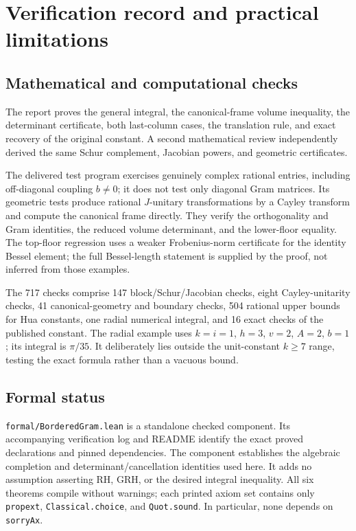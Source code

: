 \documentclass[11pt,letterpaper]{article}
\theoremstyle{remark}
\newcommand{\code}[1]{{\small\urlstyle{tt}\nolinkurl{#1}}}
\begin{document}
\section{Verification record and practical limitations}

\subsection{Mathematical and computational checks}

The report proves the general integral, the canonical-frame volume inequality,
the determinant certificate, both last-column cases, the translation rule,
and exact recovery of the original constant. A second mathematical review
independently derived the same Schur complement, Jacobian powers, and geometric
certificates.

The delivered test program exercises genuinely complex rational entries,
including off-diagonal coupling $b\ne0$; it does not test only diagonal Gram
matrices. Its geometric tests produce rational $J$-unitary transformations by
a Cayley transform and compute the canonical frame directly. They verify the
orthogonality and Gram identities, the reduced volume determinant, and the
lower-floor equality. The top-floor regression uses a weaker Frobenius-norm
certificate for the identity Bessel element; the full Bessel-length statement
is supplied by the proof, not inferred from those examples.

The 717 checks comprise 147 block/Schur/Jacobian checks, eight Cayley-unitarity
checks, 41 canonical-geometry and boundary checks, 504 rational upper bounds
for Hua constants, one radial numerical integral, and 16 exact checks of the
published constant. The radial example uses $k=i=1$, $h=3$, $v=2$, $A=2$, $b=1$;
its integral is $\pi/35$. It deliberately lies outside the unit-constant
$k\geq7$ range, testing the exact formula rather than a vacuous bound.

\subsection{Formal status}

\code{formal/BorderedGram.lean} is a standalone checked component.
Its accompanying verification log and README identify the exact proved
declarations and pinned dependencies. The component establishes the algebraic
completion and determinant/cancellation identities used here. It adds no
assumption asserting RH, GRH, or the desired integral inequality. All six
theorems compile without warnings; each printed axiom set contains only
\code{propext}, \code{Classical.choice}, and \code{Quot.sound}. In particular,
none depends on \code{sorryAx}.
\end{document}
